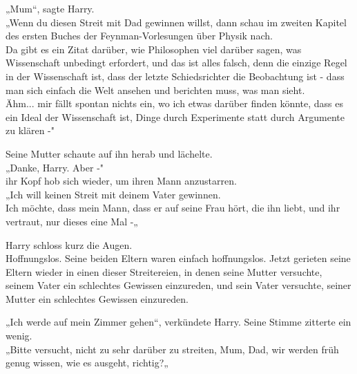 {„Mum“, sagte Harry.\\ „Wenn du diesen Streit mit Dad gewinnen willst, dann schau im zweiten Kapitel des ersten Buches der Feynman-Vorlesungen über Physik nach.\\ Da gibt es ein Zitat darüber, wie Philosophen viel darüber sagen, was Wissenschaft unbedingt erfordert, und das ist alles falsch, denn die einzige Regel in der Wissenschaft ist, dass der letzte Schiedsrichter die Beobachtung ist - dass man sich einfach die Welt ansehen und berichten muss, was man sieht.\\ Ähm... mir fällt spontan nichts ein, wo ich etwas darüber finden könnte, dass es ein Ideal der Wissenschaft ist, Dinge durch Experimente statt durch Argumente zu klären -"

Seine Mutter schaute auf ihn herab und lächelte.\\ „Danke, Harry. Aber -"\\ ihr Kopf hob sich wieder, um ihren Mann anzustarren.\\ „Ich will keinen Streit mit deinem Vater gewinnen.\\ Ich möchte, dass mein Mann, dass er auf seine Frau hört, die ihn liebt, und ihr vertraut, nur dieses eine Mal -„

Harry schloss kurz die Augen.\\ Hoffnungslos. Seine beiden Eltern waren einfach hoffnungslos. Jetzt gerieten seine Eltern wieder in einen dieser Streitereien, in denen seine Mutter versuchte, seinem Vater ein schlechtes Gewissen einzureden, und sein Vater versuchte, seiner Mutter ein schlechtes Gewissen einzureden.

„Ich werde auf mein Zimmer gehen“, verkündete Harry. Seine Stimme zitterte ein wenig.\\ „Bitte versucht, nicht zu sehr darüber zu streiten, Mum, Dad, wir werden früh genug wissen, wie es ausgeht, richtig?„

}
